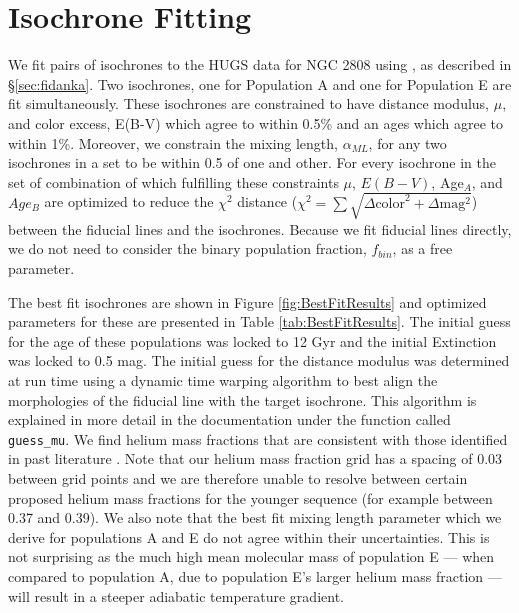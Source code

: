 \section{Isochrone Fitting}\label{sec:isoFit}
We fit pairs of isochrones to the HUGS data for NGC 2808 using \fidanka, as
described in \S \ref{sec:fidanka}. Two isochrones, one for Population A and one
for Population E are fit simultaneously. These isochrones are constrained to
have distance modulus, $\mu$, and color excess, E(B-V) which agree to within
0.5\% and an ages which agree to within 1\%. Moreover, we constrain the mixing
length, $\alpha_{ML}$, for any two isochrones in a set to be within 0.5 of one
and other. For every isochrone in the set of combination of which fulfilling
these constraints $\mu$, $E(B-V)$, Age$_{A}$, and $Age_{B}$ are optimized to
reduce the $\chi^{2}$ distance ($\chi^{2} = \sum\sqrt{\Delta \text{color}^{2} +
\Delta \text{mag} ^{2}}$) between the fiducial lines and the isochrones.
Because we fit fiducial lines directly, we do not need to consider the binary
population fraction, $f_{bin}$, as a free parameter.

The best fit isochrones are shown in Figure \ref{fig:BestFitResults} and
optimized parameters for these are presented in Table \ref{tab:BestFitResults}.
The initial guess for the age of these populations was locked to 12 Gyr
and the initial Extinction was locked to 0.5 mag. The initial guess for the
distance modulus was determined at run time using a dynamic time warping
algorithm to best align the morphologies of the fiducial line with the target
isochrone. This algorithm is explained in more detail in the \fidanka
documentation under the function called \texttt{guess\_mu}. We find helium mass
fractions that are consistent with those identified in past literature
\citep[e.g.][]{Milone2015}. Note that our helium mass fraction grid has a
spacing of 0.03 between grid points and we are therefore unable to resolve
between certain proposed helium mass fractions for the younger sequence (for
example between 0.37 and 0.39). We also note that the best fit mixing
length parameter which we derive for populations A and E do not agree within
their uncertainties. This is not surprising as the much high mean molecular mass
of population E --- when compared to population A, due to population E's larger
helium mass fraction --- will result in a steeper adiabatic temperature
gradient.

